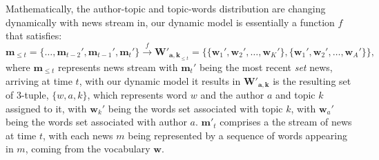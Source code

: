 Mathematically, the author-topic and topic-words distribution are changing dynamically with news stream in, our dynamic model is essentially a function $f$ that satisfies:
\begin{equation}
\label{eq:task}
\mathbf{m}_{\le t}=\{\ldots, \mathbf{m}_{t-2}', \mathbf{m}_{t-1}', \mathbf{m}_t'\}
\stackrel{f}{\longrightarrow} \boldsymbol W'_{\boldsymbol a,\boldsymbol k}_{\le t}=\{\{\mathbf{w}_1', \mathbf{w}_2', \ldots, \mathbf{w}_K'\},\{\mathbf{w}_1', \mathbf{w}_2', \ldots, \mathbf{w}_A'\}\},
\end{equation}
where $\mathbf{m}_{\le t}$ represents news stream with $\mathbf{m}_t'$ being the most recent \textit{set} news, arriving at time $t$, with our dynamic model it results in  $\boldsymbol W'_{\boldsymbol a,\boldsymbol k}$ is the resulting set of 3-tuple, $\{w,a,k\}$, which represents word $w$ and the author $a$ and topic $k$ assigned to it, with $\mathbf{w}_k'$ being the words set associated with topic $k$,  with $\mathbf{w}_a'$ being the words set associated with author $a$. $\mathbf{m}'_t$ comprises a the stream of news at time $t$, with each news $m$ being represented by a sequence of words appearing in $m$, coming from the vocabulary $\boldsymbol w$. %

